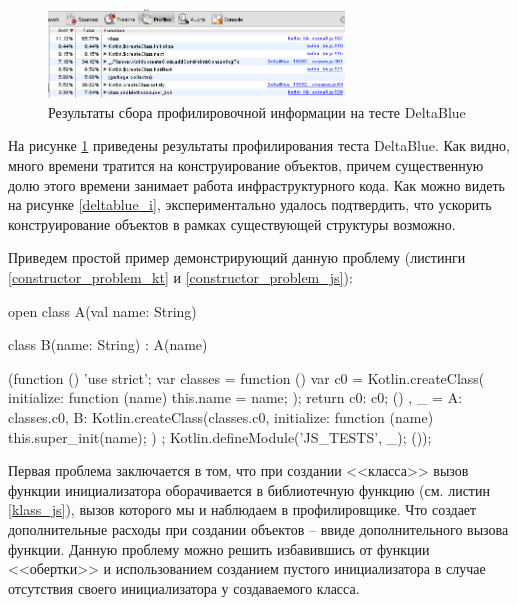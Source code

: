 \begin{figure}[ht!]
\centering
\includegraphics[width=0.7\textwidth]{img/deltablue_0_profile.png}
\caption{Результаты сбора профилировочной информации на тесте DeltaBlue}
\label{deltablue_0_prifile}
\end{figure}

На рисунке \ref{deltablue_0_prifile} приведены результаты профилирования теста DeltaBlue. Как видно, много времени тратится на конструирование объектов, причем существенную долю этого времени занимает работа инфраструктурного кода. Как можно видеть на рисунке \ref{deltablue_i}, экспериментально удалось подтвердить, что ускорить конструирование объектов в рамках существующей структуры возможно.

\newpage
Приведем простой пример демонстрирующий данную проблему (листинги \ref{constructor_problem_kt} и \ref{constructor_problem_js}):

\begin{code}
\begin{Kotlin}[caption=Пример с наследованием, label=constructor_problem_kt]
open class A(val name: String)

class B(name: String) : A(name)
\end{Kotlin}
\end{code}

\begin{code}
\begin{JavaScript}[caption=Результат компиляции пример с наследованием, label=constructor_problem_js]
(function () {
  'use strict';
  var classes = function () {
    var c0 = Kotlin.createClass({
      initialize: function (name) {
        this.name = name;
      }
    });
    return {c0: c0};
  }()
  , _ = {
    A: classes.c0,
    B: Kotlin.createClass(classes.c0, {
      initialize: function (name) {
        this.super_init(name);
      }
    })
  };
  Kotlin.defineModule('JS_TESTS', _);
}());
\end{JavaScript}
\end{code}

\newpage
Первая проблема заключается в том, что при создании <<класса>> вызов функции инициализатора  оборачивается в библиотечную функцию  (см. листин \ref{klass_js}), вызов которого мы и наблюдаем в профилировщике. Что создает дополнительные расходы при создании объектов -- ввиде дополнительного вызова функции. Данную проблему можно решить избавившись от функции <<обертки>> и использованием созданием пустого инициализатора в случае отсутствия своего инициализатора у создаваемого класса.

